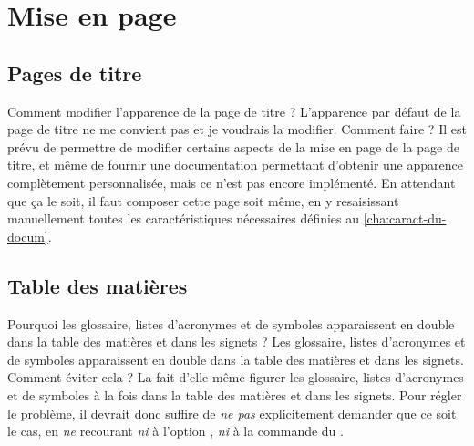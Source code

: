 
\section{Mise en page}
\label{sec:mise-en-page}

\subsection{Pages de titre}
\label{sec:pages-de-titre}

\begin{dbfaq}{Comment modifier l'apparence de la page de titre ?}{}
  L'apparence par défaut de la page de titre ne me convient pas et je voudrais
  la modifier. Comment faire ?
  \tcblower
  Il est prévu de permettre de modifier certains aspects de la mise en page de
  la page de titre, et même de fournir une documentation permettant d'obtenir
  une apparence complètement personnalisée, mais ce n'est pas encore
  implémenté.  En attendant que ça le soit, il faut composer cette page soit
  même, en y resaisissant manuellement toutes les caractéristiques nécessaires
  définies au \vref{cha:caract-du-docum}.
\end{dbfaq}

\subsection{Table des matières}
\label{sec:table-des-matieres-faq}

\begin{dbfaq}{Pourquoi les glossaire, listes d'acronymes et de symboles
    apparaissent en double dans la table des matières et dans les signets ?}{}
  Les glossaire, listes d'acronymes et de symboles apparaissent en double dans
  la table des matières et dans les signets. Comment éviter cela ?%
  \tcblower
  La \yatcl{} fait d'elle-même figurer les glossaire, listes d'acronymes et de
  symboles à la fois dans la table des matières et dans les signets. Pour
  régler le problème, il devrait donc suffire de \emph{ne pas} explicitement
  demander que ce soit le cas, en \emph{ne} recourant \emph{ni} à l'option
  , \emph{ni} à la commande  du
  .
\end{dbfaq}

